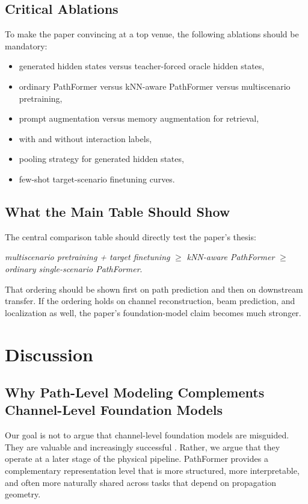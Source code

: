 \documentclass[11pt]{article}
\begin{document}
\subsection{Critical Ablations}
To make the paper convincing at a top venue, the following ablations should be mandatory:
\begin{itemize}[leftmargin=1.5em]
    \item generated hidden states versus teacher-forced oracle hidden states,
    \item ordinary PathFormer versus kNN-aware PathFormer versus multiscenario pretraining,
    \item prompt augmentation versus memory augmentation for retrieval,
    \item with and without interaction labels,
    \item pooling strategy for generated hidden states,
    \item few-shot target-scenario finetuning curves.
\end{itemize}

\subsection{What the Main Table Should Show}
The central comparison table should directly test the paper's thesis:
\begin{center}
\emph{multiscenario pretraining + target finetuning}
$\geq$
\emph{kNN-aware PathFormer}
$\geq$
\emph{ordinary single-scenario PathFormer}.
\end{center}
That ordering should be shown first on path prediction and then on downstream transfer. If the ordering holds on channel reconstruction, beam prediction, and localization as well, the paper's foundation-model claim becomes much stronger.

\section{Discussion}
\subsection{Why Path-Level Modeling Complements Channel-Level Foundation Models}
Our goal is not to argue that channel-level foundation models are misguided. They are valuable and increasingly successful \cite{lwm,wifo,csiclip,channelgpt,contrawimae}. Rather, we argue that they operate at a later stage of the physical pipeline. PathFormer provides a complementary representation level that is more structured, more interpretable, and often more naturally shared across tasks that depend on propagation geometry.
\end{document}
